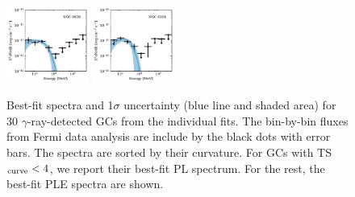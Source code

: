 \documentclass[doublespace,nopageskip]{VTthesis} %
\begin{document}
\begin{appendices}
\begin{figure}
\includegraphics[width=0.24\textwidth]{Figures/Globular/spectra/PLE_spectrum_25.pdf}
\includegraphics[width=0.24\textwidth]{Figures/Globular/spectra/PLE_spectrum_12.pdf}
\caption{Best-fit spectra and 1$\sigma$ uncertainty (blue line and shaded area) for 30 $\gamma$-ray-detected GCs from the individual fits. The bin-by-bin fluxes from Fermi data analysis are include by the black dots with error bars. The spectra are sorted by their curvature. For GCs with TS$_{\rm curve} < 4$, we report their best-fit PL spectrum. For the rest, the best-fit PLE spectra are shown.}
\label{fig:spectra}
\end{figure}


\end{appendices}
\end{document}

